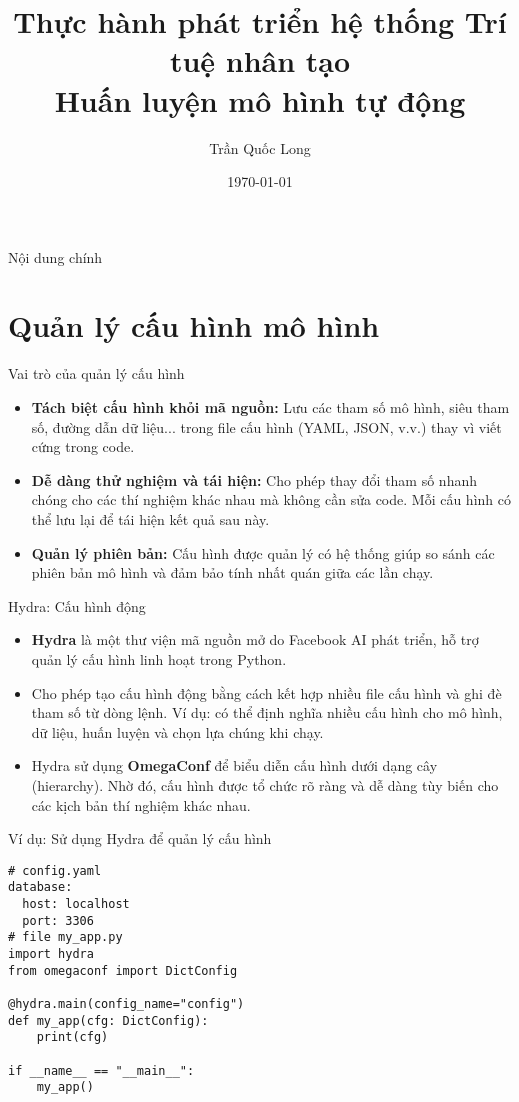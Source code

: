 \documentclass{beamer}
\title{Thực hành phát triển hệ thống Trí tuệ nhân tạo\\
Huấn luyện mô hình tự động
}
\author{Trần Quốc Long}
\institute{Trường ĐH Công nghệ, ĐHQG Hà Nội}
\date{\today}
\begin{document}
\frame{\titlepage}

\begin{frame}{Nội dung chính}
    \tableofcontents
\end{frame}

\section{Quản lý cấu hình mô hình}

\begin{frame}{Vai trò của quản lý cấu hình}
    \begin{itemize}
        \item \textbf{Tách biệt cấu hình khỏi mã nguồn:} Lưu các tham số mô hình, siêu tham số, đường dẫn dữ liệu... trong file cấu hình (YAML, JSON, v.v.) thay vì viết cứng trong code.
        \item \textbf{Dễ dàng thử nghiệm và tái hiện:} Cho phép thay đổi tham số nhanh chóng cho các thí nghiệm khác nhau mà không cần sửa code. Mỗi cấu hình có thể lưu lại để tái hiện kết quả sau này.
        \item \textbf{Quản lý phiên bản:} Cấu hình được quản lý có hệ thống giúp so sánh các phiên bản mô hình và đảm bảo tính nhất quán giữa các lần chạy.
    \end{itemize}
\end{frame}

\begin{frame}{Hydra: Cấu hình động}
    \begin{itemize}
        \item \textbf{Hydra} là một thư viện mã nguồn mở do Facebook AI phát triển, hỗ trợ quản lý cấu hình linh hoạt trong Python.
        \item Cho phép tạo cấu hình động bằng cách kết hợp nhiều file cấu hình và ghi đè tham số từ dòng lệnh. Ví dụ: có thể định nghĩa nhiều cấu hình cho mô hình, dữ liệu, huấn luyện và chọn lựa chúng khi chạy.
        \item Hydra sử dụng \textbf{OmegaConf} để biểu diễn cấu hình dưới dạng cây (hierarchy). Nhờ đó, cấu hình được tổ chức rõ ràng và dễ dàng tùy biến cho các kịch bản thí nghiệm khác nhau.
    \end{itemize}
\end{frame}

\begin{frame}[fragile]{Ví dụ: Sử dụng Hydra để quản lý cấu hình}

\begin{verbatim}
# config.yaml
database:
  host: localhost
  port: 3306
# file my_app.py
import hydra
from omegaconf import DictConfig

@hydra.main(config_name="config")
def my_app(cfg: DictConfig):
    print(cfg)

if __name__ == "__main__":
    my_app()
\end{verbatim}
\end{frame}
\end{document}
